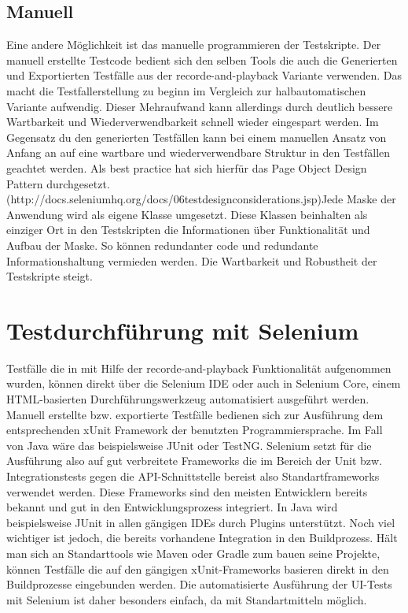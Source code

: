 \subsection{Manuell}
\label{sec:manuell}
Eine andere Möglichkeit ist das manuelle programmieren der Testskripte. Der manuell erstellte Testcode bedient sich den selben Tools die auch die Generierten und Exportierten Testfälle aus der recorde-and-playback Variante verwenden. Das macht die Testfallerstellung zu beginn im Vergleich zur halbautomatischen Variante aufwendig. Dieser Mehraufwand kann allerdings durch deutlich bessere Wartbarkeit und Wiederverwendbarkeit schnell wieder eingespart werden. Im Gegensatz du den generierten Testfällen kann bei einem manuellen Ansatz von Anfang an auf eine wartbare und wiederverwendbare Struktur in den Testfällen geachtet werden. Als best practice hat sich hierfür das Page Object Design Pattern durchgesetzt. (http://docs.seleniumhq.org/docs/06testdesignconsiderations.jsp)Jede Maske der Anwendung wird als eigene Klasse umgesetzt. Diese Klassen beinhalten als einziger Ort in den Testskripten die Informationen über Funktionalität und Aufbau der Maske. So können redundanter code und redundante Informationshaltung vermieden werden. Die Wartbarkeit und Robustheit der Testskripte steigt.


\section{Testdurchführung mit Selenium}
\label{sec:testdurchführung_mit_selenium}

Testfälle die in mit Hilfe der recorde-and-playback Funktionalität aufgenommen wurden, können direkt über die Selenium IDE oder auch in Selenium Core, einem HTML-basierten Durchführungswerkzeug automatisiert ausgeführt werden. 
Manuell erstellte bzw. exportierte Testfälle bedienen sich zur Ausführung dem entsprechenden xUnit Framework der benutzten Programmiersprache. Im Fall von Java wäre das beispielsweise JUnit oder TestNG. Selenium setzt für die Ausführung also auf gut verbreitete Frameworks die im Bereich der Unit bzw. Integrationstests gegen die API-Schnittstelle bereist also Standartframeworks verwendet werden. Diese Frameworks sind den meisten Entwicklern bereits bekannt und gut in den Entwicklungsprozess integriert. In Java wird beispielsweise JUnit in allen gängigen IDEs durch Plugins unterstützt. Noch viel wichtiger ist jedoch, die bereits vorhandene Integration in den Buildprozess.
Hält man sich an Standarttools wie Maven oder Gradle zum bauen seine Projekte, können Testfälle die auf den gängigen xUnit-Frameworks basieren direkt in den Buildprozesse eingebunden werden.
Die automatisierte Ausführung der UI-Tests mit Selenium ist daher besonders einfach, da mit Standartmitteln möglich.

